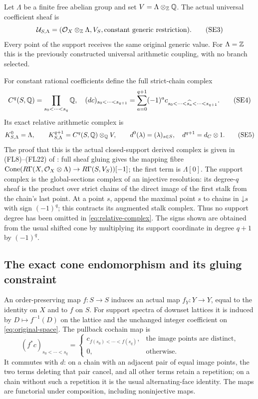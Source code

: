 Let $\Lambda$ be a finite free abelian group and set
$V=\Lambda\otimes_{\mathbb Z}\mathbb Q$. The actual universal coefficient sheaf is
\[
 \mathcal U_{S,\Lambda}
   =(\mathcal O_X\otimes_{\mathbb Z}\Lambda,V_S,
                 \text{constant generic restriction}).
 \tag{SE3}\label{eq:universal-coefficients}
\]
Every point of the support receives the same original generic value.
For $\Lambda=\mathbb Z$ this is the previously constructed universal
arithmetic coupling, with no branch selected.

For constant rational coefficients define the full strict-chain complex
\[
 C^q(S,\mathbb Q)=\prod_{s_0<\cdots<s_q}\mathbb Q,
 \quad
 (dc)_{s_0<\cdots<s_{q+1}}
   =\sum_{a=0}^{q+1}(-1)^a
         c_{s_0<\cdots<\widehat{s_a}<\cdots<s_{q+1}}.
 \tag{SE4}\label{eq:support-complex}
\]
Its exact relative arithmetic complex is
\[
 K_{S,\Lambda}^0=\Lambda,\qquad
 K_{S,\Lambda}^{q+1}=C^q(S,\mathbb Q)\otimes_\mathbb Q V,\qquad
 d^0(\lambda)=(\lambda)_{s\in S},\quad d^{q+1}=d_C\otimes1.
 \tag{SE5}\label{eq:relative-complex}
\]
The proof that this is the actual closed-support derived complex is
given in (FL8)--(FL22) of :
full sheaf gluing gives the mapping fibre
$\operatorname{Cone}(R\Gamma(X,\mathcal O_X\otimes\Lambda)
\to R\Gamma(S,V_S))[-1]$; the first term is $\Lambda[0]$.
The support complex is the global-sections complex of an injective
resolution: its degree-$q$ sheaf
is the product over strict chains of the direct image of the first
stalk from the chain's last point. At a point $s$, append the maximal
point $s$ to chains in $\mathord\downarrow s$ with sign $(-1)^q$;
this contracts its augmented stalk complex. Thus no support degree
has been omitted in \eqref{eq:relative-complex}. The signs shown
are obtained from the usual shifted cone by multiplying its support
coordinate in degree $q+1$ by $(-1)^q$.

\subsection{The exact cone endomorphism and its gluing constraint}

An order-preserving map $f:S\to S$ induces an actual map
$f_Y:Y\to Y$, equal to the identity on $X$ and to $f$ on $S$.
For support spectra of downset lattices it is induced by
$D\mapsto f^{-1}(D)$ on the lattice and the unchanged integer
coefficient on \eqref{eq:original-space}.
The pullback cochain map is
\[
 (f^*c)_{s_0<\cdots<s_q}=
 \begin{cases}
 c_{f(s_0)<\cdots<f(s_q)},&\text{the image points are distinct},\\
 0,&\text{otherwise}.
 \end{cases}
 \tag{SE6}\label{eq:finite-pullback}
\]
It commutes with $d$: on a chain with an adjacent pair of equal image
points, the two terms deleting that pair cancel, and all other terms
retain a repetition; on a chain without such a repetition it is the
usual alternating-face identity. The maps are functorial under
composition, including noninjective maps.

